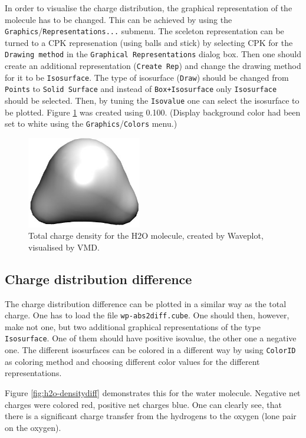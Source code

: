 In order to visualise the charge distribution, the graphical representation of
the molecule has to be changed. This can be achieved by using the
\verb|Graphics|/\verb|Representations...| submenu. The sceleton representation
can be turned to a CPK represenation (using balls and stick) by selecting CPK
for the \verb|Drawing method| in the \verb|Graphical Representations| dialog
box. Then one should create an additional representation (\verb|Create Rep|) and
change the drawing method for it to be \verb|Isosurface|. The type of isosurface
(\verb|Draw|) should be changed from \verb|Points| to \verb|Solid Surface| and
instead of \verb|Box+Isosurface| only \verb|Isosurface| should be selected.
Then, by tuning the \verb|Isovalue| one can select the isosurface to be
plotted. Figure \ref{fig:h2o-density} was created using 0.100. (Display
background color had been set to white using the \verb|Graphics|/\verb|Colors|
menu.)

\begin{figure}
  \centering
  \includegraphics[width=5cm]{figures/h2o-density.jpg}
  \caption{Total charge density for the H2O molecule, created by Waveplot, visualised by VMD.}
  \label{fig:h2o-density}
\end{figure}


\subsection{Charge distribution difference}

The charge distribution difference can be plotted in a similar way as the total
charge. One has to load the file \verb|wp-abs2diff.cube|. One should then,
however, make not one, but two additional graphical representations of the type
\verb|Isosurface|. One of them should have positive isovalue, the other one a
negative one. The different isosurfaces can be colored in a different way by
using \verb|ColorID| as coloring method and choosing different color values for
the different representations.

Figure \ref{fig:h2o-densitydiff} demonstrates this for the water
molecule. Negative net charges were colored red, positive net charges blue. One
can clearly see, that there is a significant charge transfer from the hydrogens
to the oxygen (lone pair on the oxygen).

